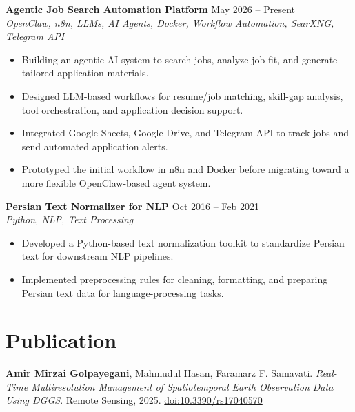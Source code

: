 \documentclass[a4paper,10pt]{article}
\newcommand{\resumeSubheading}[4]{
    \textbf{#1} \hfill #2 \\
    \textit{#3} \hfill \textit{#4}
}
\begin{document}
\noindent
\textbf{Agentic Job Search Automation Platform} \hfill May 2026 -- Present \\
\textit{OpenClaw, n8n, LLMs, AI Agents, Docker, Workflow Automation, SearXNG, Telegram API}
\begin{itemize}[leftmargin=0.25in]
    \item Building an agentic AI system to search jobs, analyze job fit, and generate tailored application materials.
    \item Designed LLM-based workflows for resume/job matching, skill-gap analysis, tool orchestration, and application decision support.
    \item Integrated Google Sheets, Google Drive, and Telegram API to track jobs and send automated application alerts.
    \item Prototyped the initial workflow in n8n and Docker before migrating toward a more flexible OpenClaw-based agent system.
\end{itemize}

\noindent
\textbf{Persian Text Normalizer for NLP} \hfill Oct 2016 -- Feb 2021 \\
\textit{Python, NLP, Text Processing}
\begin{itemize}[leftmargin=0.25in]
    \item Developed a Python-based text normalization toolkit to standardize Persian text for downstream NLP pipelines.
    \item Implemented preprocessing rules for cleaning, formatting, and preparing Persian text data for language-processing tasks.
\end{itemize}

\section*{Publication}

\textbf{Amir Mirzai Golpayegani}, Mahmudul Hasan, Faramarz F. Samavati. 
\textit{Real-Time Multiresolution Management of Spatiotemporal Earth Observation Data Using DGGS}. 
Remote Sensing, 2025. \href{https://doi.org/10.3390/rs17040570}{doi:10.3390/rs17040570}



\end{document}
